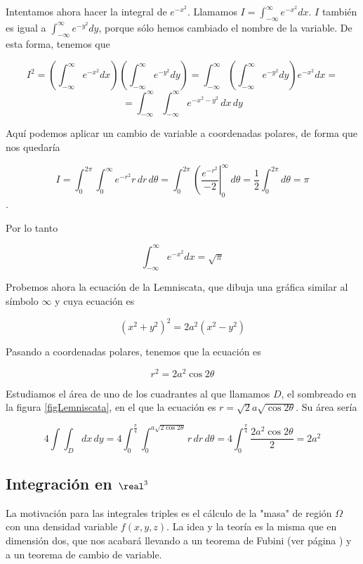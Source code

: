 \documentclass[12pt,a4paper,titlepage]{apuntes}
\begin{document}
Intentamos ahora hacer la integral de $e^{-x^2}$. Llamamos $I=\int_{-\infty}^{\infty} e^{-x^2}dx$. $I$ también es igual a $\int_{-\infty}^{\infty} e^{-y^2}dy$, porque sólo hemos cambiado el nombre de la variable. De esta forma, tenemos que

\[ I^2 = \left(\int_{-\infty}^{\infty} e^{-x^2}dx\right)\left(\int_{-\infty}^{\infty} e^{-y^2}dy\right) = \int_{-\infty}^{\infty}\left(\int_{-\infty}^{\infty} e^{-y^2}dy\right)e^{-x^2}dx = \]
\[ = \int_{-\infty}^{\infty}\int_{-\infty}^{\infty}e^{-x^2-y^2}\,dx\,dy \]

Aquí podemos aplicar un cambio de variable a coordenadas polares, de forma que nos quedaría

\[ I = \int_0^{2\pi} \int_0^{\infty} e^{-r^2}r\,dr\,d\theta = \int_0^{2\pi} \left(\frac{e^{-r^2}}{-2}\right|_0^{\infty} \,d\theta = \frac{1}{2}\int_0^{2\pi} d\theta = \pi \].

Por lo tanto

\[ \int_{-\infty}^{\infty} e^{-x^2}dx = \sqrt{\pi} \]

Probemos ahora la ecuación de la  Lemniscata, que dibuja una gráfica similar al símbolo $\infty$ y cuya ecuación es

\[ (x^2+y^2)^2 = 2a^2(x^2-y^2) \]

Pasando a coordenadas polares, tenemos que la ecuación es

\[ r^2 = 2a^2\cos 2\theta \]


Estudiamos el área de uno de los cuadrantes al que llamamos $D$, el sombreado en la figura \ref{figLemniscata}, en el que la ecuación es $r = \sqrt{2} a \sqrt{\cos 2\theta}$. Su área sería

\[ 4\int\int_D dx\,dy = 4\int_0^{\frac{\pi}{4}} \int_0^{a\sqrt{2\cos 2\theta}} r \,dr\,d\theta = 4\int_0^{\frac{\pi}{4}} \frac{2a^2\cos 2\theta}{2} = 2a^2 \]

\subsection{Integración en $\real^3$}

La motivación para las integrales triples es el cálculo de la "masa" de región $\Omega$ con una densidad variable $f(x,y,z)$. La idea y la teoría es la misma que en dimensión dos, que nos acabará llevando a un teorema de Fubini (ver página \pageref{lblFubini}) y a un teorema de cambio de variable.
\end{document}

